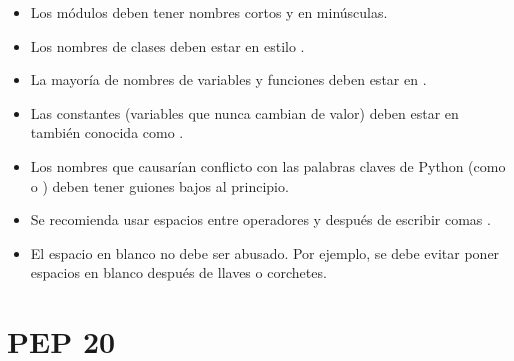 \begin{itemize}
    \item Los módulos deben tener nombres cortos y en minúsculas.
    
    
    \item Los nombres de clases deben estar en estilo .
    

    \item La mayoría de nombres de variables y funciones deben estar en .
    


    \item Las constantes (variables que nunca cambian de valor) deben estar en  también conocida como .
    

    \item Los nombres que causarían conflicto con las palabras claves de Python (como  o ) deben tener guiones bajos al principio.
    


    \item Se recomienda usar espacios entre operadores y después de escribir comas \ttt{,}.
    


    \item El espacio en blanco no debe ser abusado. Por ejemplo, se debe evitar poner espacios en blanco después de llaves o corchetes.
    
    
\end{itemize}

\section{PEP 20}

\clearpage